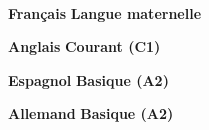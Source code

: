 \documentclass[10pt,a4paper,ragged2e,withhyper]{../AltaCV/altacv}
\begin{document}
\begin{paracol}{2}
  \\

  \divider

  \cvtag{\LaTeX}


  \textcolor{emphasis}{\textbf{Français}} \hfill \textbf{Langue maternelle}\\

  \divider

  \textcolor{emphasis}{\textbf{Anglais}} \hfill \textbf{Courant (C1)}\\

  \divider

  \textcolor{emphasis}{\textbf{Espagnol}} \hfill \textbf{Basique (A2)}\\

  \divider

  \textcolor{emphasis}{\textbf{Allemand}} \hfill \textbf{Basique (A2)}\\

\end{paracol}
\end{document}
